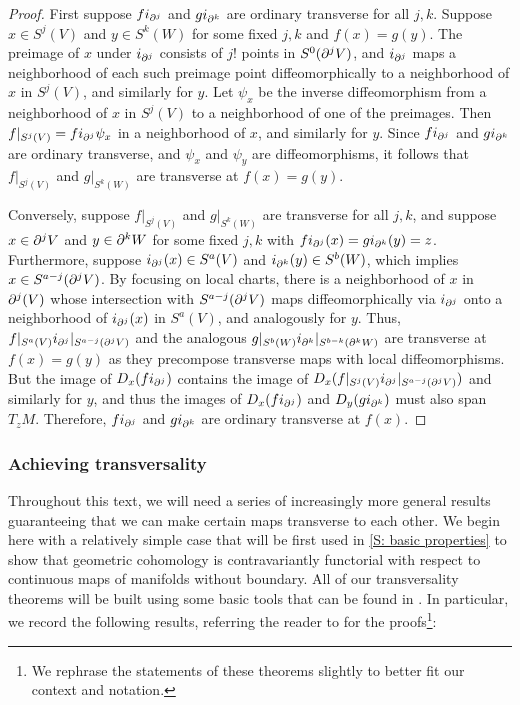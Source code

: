 \begin{proof}
	First suppose $fi_{\partial^j}$ and $gi_{\partial^k}$ are ordinary transverse for all $j,k$.
	Suppose $x\in S^j(V)$ and $y\in S^k(W)$ for some fixed $j,k$ and $f(x)=g(y)$.
	The preimage of $x$ under $i_{\partial^j}$ consists of $j!$ points in $S^0(\partial^jV)$, and $i_{\partial^j}$ maps a neighborhood of each such preimage point diffeomorphically to a neighborhood of $x$ in $S^j(V)$, and similarly for $y$.
	Let $\psi_x$ be the inverse diffeomorphism from a neighborhood of $x$ in $S^j(V)$ to a neighborhood of one of the preimages.
	Then $f|_{S^j(V)}=fi_{\partial^j}\psi_x$ in a neighborhood of $x$, and similarly for $y$.
	Since $fi_{\partial^j}$ and $gi_{\partial^k}$ are ordinary transverse, and $\psi_x$ and $\psi_y$ are diffeomorphisms, it follows that $f|_{S^j(V)}$ and $g|_{S^k(W)}$ are transverse at $f(x)=g(y)$.

	Conversely, suppose $f|_{S^j(V)}$ and $g|_{S^k(W)}$ are transverse for all $j,k$, and suppose $x\in \partial^jV$ and $y\in \partial^kW$ for some fixed $j,k$ with $fi_{\partial^j}(x)=gi_{\partial^k}(y)=z$.
	Furthermore, suppose $i_{\partial^j}(x)\in S^a(V)$ and $i_{\partial^k}(y)\in S^b(W)$, which implies $x\in S^{a-j}(\partial^j V)$.
	By focusing on local charts, there is a neighborhood of $x$ in $\partial^j(V)$ whose intersection with $S^{a-j}(\partial^j V)$ maps diffeomorphically via $i_{\partial^j}$ onto a neighborhood of $i_{\partial^j}(x)$ in $S^a(V)$, and analogously for $y$.
	Thus, $f|_{S^a(V)}i_{\partial^j}|_{S^{a-j}(\partial^j V)}$ and the analogous $g|_{S^b(W)}i_{\partial^k}|_{S^{b-k}(\partial^k W)}$ are transverse at $f(x)=g(y)$ as they precompose transverse maps with local diffeomorphisms.
	But the image of $D_x(fi_{\partial^j})$ contains the image of $D_x(f|_{S^j(V)}i_{\partial^j}|_{S^{a-j}(\partial^j V)})$ and similarly for $y$, and thus the images of $D_x(fi_{\partial^j})$ and $D_y(gi_{\partial^k})$ must also span $T_{z}M$.
	Therefore, $fi_{\partial^j}$ and $gi_{\partial^k}$ are ordinary transverse at $f(x)$.
\end{proof}

\subsubsection{Achieving transversality}

Throughout this text, we will need a series of increasingly more general results guaranteeing that we can make certain maps transverse to each other.
We begin here with a relatively simple case that will be first used in \cref{S: basic properties} to show that geometric cohomology is contravariantly functorial with respect to continuous maps of manifolds without boundary.
All of our transversality theorems will be built using some basic tools that can be found in \cite[Section 2.3]{GuPo74}.
In particular, we record the following results, referring the reader to \cite[Section 2.3]{GuPo74} for the proofs\footnote{We rephrase the statements of these theorems slightly to better fit our context and notation.}:

